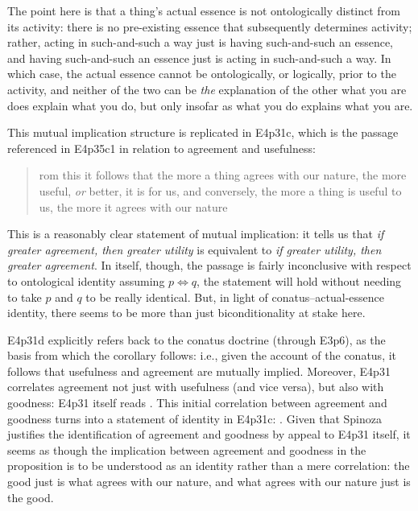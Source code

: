 \documentclass{article}
\newcommand{\dash}{\unskip{—}}
\begin{document}
The point here is that a thing's actual essence is not ontologically distinct from its activity: there is no pre-existing essence that subsequently determines activity; rather, acting in such-and-such a way just is having such-and-such an essence, and having such-and-such an essence just is acting in such-and-such a way. In which case, the actual essence cannot be ontologically, or logically, prior to the activity, and neither of the two can be \emph{the} explanation of the other \dash what you are does explain what you do, but only insofar as what you do explains what you are.

This mutual implication structure is replicated in E4p31c, which is the passage referenced in E4p35c1 in relation to agreement and usefulness: \blockquote[][.]{rom this it follows that the more a thing agrees with our nature, the more useful, \emph{or} better, it is for us, and conversely, the more a thing is useful to us, the more it agrees with our nature} This is a reasonably clear statement of mutual implication: it tells us that \emph{if greater agreement, then greater utility} is equivalent to \emph{if greater utility, then greater agreement}. In itself, though, the passage is fairly inconclusive with respect to ontological identity \dash assuming $p \iff q$, the statement will hold without needing to take $p$ and $q$ to be really identical. But, in light of conatus–actual-essence identity, there seems to be more than just biconditionality at stake here.

E4p31d explicitly refers back to the conatus doctrine (through E3p6), as the basis from which the corollary follows: i.e., given the account of the conatus, it follows that usefulness and agreement are mutually implied. Moreover, E4p31 correlates agreement not just with usefulness (and vice versa), but also with goodness: E4p31 itself reads . This initial correlation between agreement and goodness turns into a statement of identity in E4p31c: . Given that Spinoza justifies the identification of agreement and goodness by appeal to E4p31 itself, it seems as though the implication between agreement and goodness in the proposition is to be understood as an identity rather than a mere correlation: the good just is what agrees with our nature, and what agrees with our nature just is the good.
\end{document}

